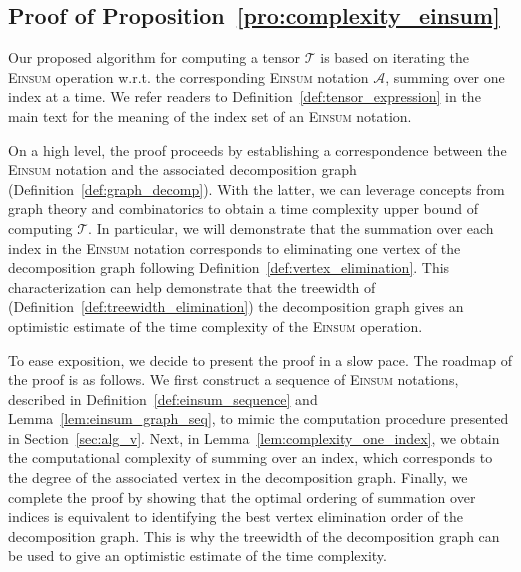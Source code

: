 \documentclass[12pt]{article}
\theoremstyle{plain}
\theoremstyle{definition}
\def\Einsum{\textsc{Einsum}}
\def\calA{\mathcal{A}}
\def\calT{\mathcal{T}}
\begin{document}
\begin{bibunit}[agsm]
\section{Proof of Proposition~\ref{pro:complexity_einsum}}
\label{app:complexity_einsum}

Our proposed algorithm for computing a tensor $\calT$ is based on iterating the \Einsum{} operation w.r.t. the corresponding \Einsum{} notation $\calA$, summing over one index at a time. We refer readers to Definition~\ref{def:tensor_expression} in the main text for the meaning of the index set of an \Einsum{} notation. 

On a high level, the proof proceeds by establishing a correspondence between the \Einsum{} notation and the associated decomposition graph (Definition~\ref{def:graph_decomp}). With the latter, we can leverage concepts from graph theory and combinatorics to obtain a time complexity upper bound of computing $\calT$. In particular, we will demonstrate that the summation over each index in the \Einsum{} notation corresponds to eliminating one vertex of the decomposition graph following Definition~\ref{def:vertex_elimination}. This characterization can help demonstrate that the treewidth of (Definition~\ref{def:treewidth_elimination}) the decomposition graph gives an optimistic estimate of the time complexity of the \Einsum{} operation.

To ease exposition, we decide to present the proof in a slow pace. The roadmap of the proof is as follows. We first construct a sequence of \Einsum{} notations, described in Definition~\ref{def:einsum_sequence} and Lemma~\ref{lem:einsum_graph_seq}, to mimic the computation procedure presented in Section~\ref{sec:alg_v}. Next, in Lemma~\ref{lem:complexity_one_index}, we obtain the computational complexity of summing over an index, which corresponds to the degree of the associated vertex in the decomposition graph. Finally, we complete the proof by showing that the optimal ordering of summation over indices is equivalent to identifying the best vertex elimination order of the decomposition graph. This is why the treewidth of the decomposition graph can be used to give an optimistic estimate of the time complexity.



\end{bibunit}
\end{document}
